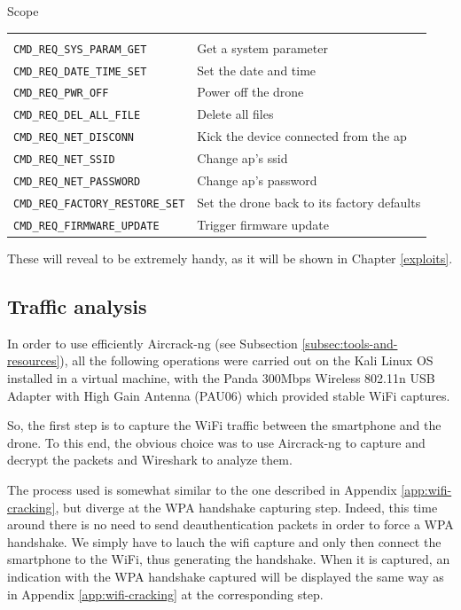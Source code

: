 \begin{chaptercover}{Scope}
\begin{center}
  \begin{tabular}{C{7cm}L{7cm}}
   &  \\
  \texttt{CMD\_REQ\_SYS\_PARAM\_GET} & Get a system parameter \\
  \texttt{CMD\_REQ\_DATE\_TIME\_SET} & Set the date and time \\
  \texttt{CMD\_REQ\_PWR\_OFF} & Power off the drone \\
  \texttt{CMD\_REQ\_DEL\_ALL\_FILE} & Delete all files \\
  \texttt{CMD\_REQ\_NET\_DISCONN} & Kick the device connected from the \acrshort{ap} \\
  \texttt{CMD\_REQ\_NET\_SSID} & Change \acrshort{ap}'s \acrshort{ssid} \\
  \texttt{CMD\_REQ\_NET\_PASSWORD} & Change \acrshort{ap}'s password \\
  \texttt{CMD\_REQ\_FACTORY\_RESTORE\_SET} & Set the drone back to its factory defaults \\
  \texttt{CMD\_REQ\_FIRMWARE\_UPDATE} & Trigger firmware update \\
  \end{tabular}
\end{center}

These will reveal to be extremely handy, as it will be shown in Chapter \ref{exploits}.

\subsection{Traffic analysis}\label{subsec:traffic-analysis}

\begin{warning}
In order to use efficiently Aircrack-ng (see Subsection \ref{subsec:tools-and-resources}), all the following operations were carried out on the Kali Linux OS installed in a virtual machine, with the Panda 300Mbps Wireless 802.11n USB Adapter with High Gain Antenna (PAU06) \cite{panda-adapter} which provided stable WiFi captures.
\end{warning}

So, the first step is to capture the WiFi traffic between the smartphone and the drone. To this end, the obvious choice was to use Aircrack-ng to capture and decrypt the packets and Wireshark to analyze them.

The process used is somewhat similar to the one described in Appendix \ref{app:wifi-cracking}, but diverge at the WPA handshake capturing step. Indeed, this time around there is no need to send deauthentication packets in order to force a WPA handshake. We simply have to lauch the wifi capture and only then connect the smartphone to the WiFi, thus generating the handshake. When it is captured, an indication with the WPA handshake captured will be displayed the same way as in Appendix \ref{app:wifi-cracking} at the corresponding step.


\end{chaptercover}
